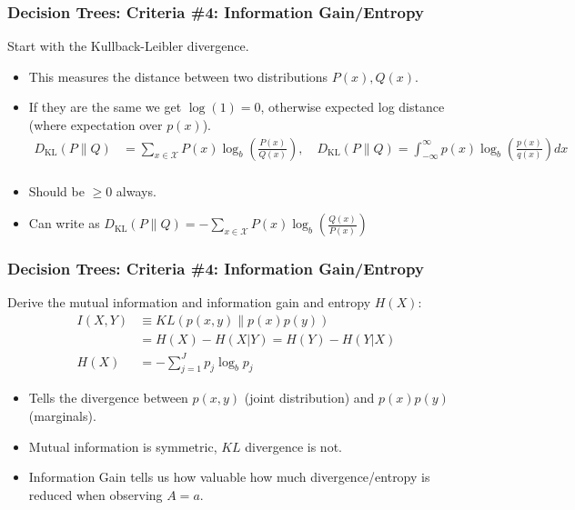 \documentclass[xcolor=pdftex,dvipsnames,table,mathserif,aspectratio=169]{beamer}
\begin{document}
\begin{frame}
\frametitle{Decision Trees: Criteria \#4: Information Gain/Entropy}
Start with the Kullback-Leibler divergence.
\begin{itemize}
\item This measures the distance between two distributions $P(x),Q(x)$.
\item If they are the same we get $\log(1) = 0$, otherwise expected log distance (where expectation over $p(x)$).
\begin{align*}
D_{\mathrm{KL}}(P \| Q)&=\sum_{x \in \mathcal{X}} P(x) \log_b \left(\frac{P(x)}{Q(x)}\right), \quad
D_{\mathrm{KL}}(P \| Q)=\int_{-\infty}^{\infty} p(x) \log_b \left(\frac{p(x)}{q(x)}\right) d x\\
\end{align*}
\item Should be $ \geq 0$ always.
\item Can write as $D_{\mathrm{KL}}(P \| Q)=-\sum_{x \in \mathcal{X}} P(x) \log_b \left(\frac{Q(x)}{P(x)}\right)$
\end{itemize}
\end{frame}

\begin{frame}
\frametitle{Decision Trees: Criteria \#4: Information Gain/Entropy}
Derive the \alert{mutual information} and \alert{information gain} and \alert{entropy} $H(X)$:
\begin{align*}
I(X, Y) &\equiv K L(p(x, y) \| p(x) p(y))\\
 &= H(X)- H(X|Y)= H(Y)- H(Y|X)\\
 H(X) &= - \sum_{j=1}^J p_j \log_b p_j
\end{align*}
\begin{itemize}
\item Tells the divergence between $p(x,y)$ (joint distribution) and $p(x) p(y)$ (marginals).
\item Mutual information is symmetric, $KL$ divergence is not.
\item \alert{Information Gain} tells us how valuable how much divergence/entropy is reduced when observing $A=a$.
\end{itemize}
\end{frame}
\end{document}
